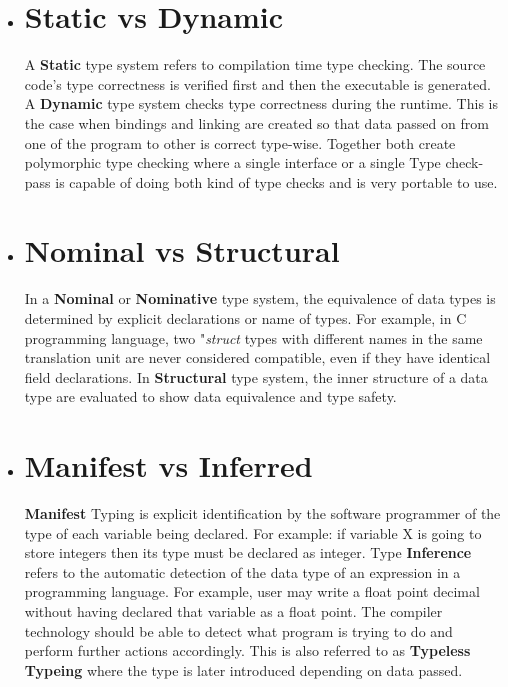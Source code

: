 \begin{itemize} 
\item {\section*{Static vs Dynamic}

A \textbf{Static} type system refers to compilation time type checking. The source code's type correctness is verified first and then the executable is generated. A \textbf{Dynamic} type system checks type correctness during the runtime. This is the case when bindings and linking are created so that data passed on from one of the program to other is correct type-wise. Together both create polymorphic type checking where a single interface or a single Type check-pass is capable of doing both kind of type checks and is very portable to use. \\}

\item {
\section*{Nominal vs Structural}
In a \textbf{Nominal} or \textbf{Nominative} type system, the equivalence of data types is determined by explicit declarations or name of types. For example, in C programming language, two "\textit{struct} types with different names in the same translation unit are never considered compatible, even if they have identical field declarations. In \textbf{Structural} type system, the inner structure of a data type are evaluated  to show data equivalence and type safety. }

\item{
\section*{Manifest vs Inferred}
\textbf{Manifest} Typing is explicit identification by the software programmer of the type of each variable being declared. For example: if variable X is going to store integers then its type must be declared as integer. Type \textbf{Inference} refers to the automatic detection of the data type of an expression in a programming language. For example, user may write a float point decimal without having declared that variable as a float point. The compiler technology should be able to detect what program is trying to do and perform further actions accordingly. This is also referred to as \textbf{Typeless Typeing} where the type is later introduced depending on data passed.\\ }


\end{itemize}
